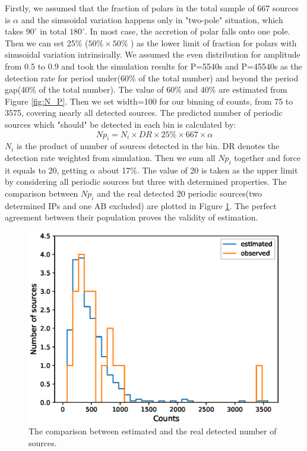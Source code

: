 \documentclass[fleqn,usenatbib]{mnras}
\begin{document}
Firstly, we assumed that the fraction of polars in the total sample of 667 sources is $\alpha$ and the sinusoidal variation happens only in "two-pole" situation, which takes $90^\circ$ in total $180^\circ$. In most case, the accretion of polar falls onto one pole. Then we can set 25\% ($50\% \times 50\%$ ) as the lower limit of fraction for polars with sinusoidal variation intrinsically. We assumed the even distribution for amplitude from 0.5 to 0.9 and took the simulation results for P=5540s and P=45540s as the detection rate for period under(60\% of the total number) and beyond the period gap(40\% of the total number). The value of 60\% and 40\% are estimated from Figure \ref{fig:N_P}. Then we set width=100 for our binning of counts, from 75 to 3575, covering nearly all detected sources. 
 The predicted number of periodic sources which "should" be detected in each bin is calculated by:
\begin{equation}
Np_{i}=N_i\times DR \times 25\% \times 667 \times \alpha	
\end{equation}
$N_i$ is the product of number of sources detected in the bin. DR denotes the detection rate weighted from simulation. Then we sum all $Np_{i}$ together and force it equals to 20, getting $\alpha$ about 17\%. The value of 20 is taken as the upper limit by considering all periodic sources but three with determined properties.
 The comparison between $Np_{i}$ and the real detected 20 periodic sources(two determined IPs and one AB excluded) are plotted in Figure \ref{fig:NP_sim}. The perfect agreement between their population proves the validity of estimation.

\begin{figure}
\includegraphics[scale=0.53]{./figure/sim_LW/est_obs.eps}
\caption{The comparison between estimated and the real detected number of sources. \label{fig:NP_sim}}
\end{figure}
\end{document}
